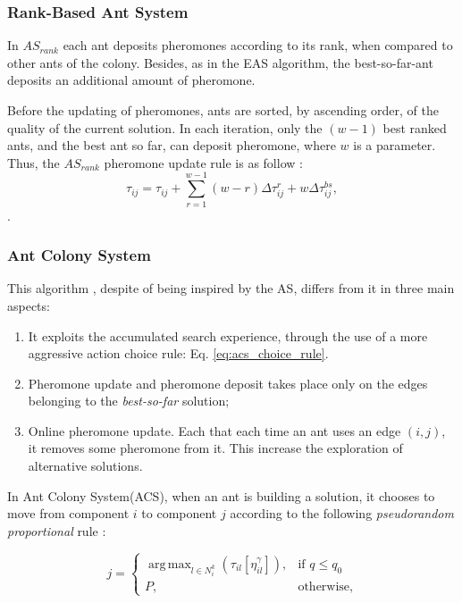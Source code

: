 					\subsubsection*{Rank-Based Ant System}

					In $AS_{rank}$ each ant deposits pheromones according to its rank, when compared to other ants of the colony. Besides, as in the EAS algorithm, the best-so-far-ant deposits an additional amount of pheromone.

					Before the updating of pheromones, ants are sorted, by ascending order, of the quality of the current solution. In each iteration, only the $(w-1)$ best ranked ants, and the best ant so far, can deposit pheromone, where $w$ is a parameter. Thus, the $AS_{rank}$ pheromone update rule is as follow \cite{bullnheimer97}:
					\begin{equation}
						\label{eq:asrank_pheromone_update}
						\tau_{ij} = \tau_{ij} + \sum_{r=1}^{w-1}(w-r)\Delta\tau_{ij}^r + w\Delta\tau_{ij}^{bs},
					\end{equation}.

					\subsubsection*{Ant Colony System}
					\label{sec:acs}
					This algorithm \cite{dorigo97}, despite of being inspired by the AS, differs from it in three main aspects:
					\begin{enumerate}
						\item It exploits the accumulated search experience, through the use of a more aggressive action choice rule: Eq. \ref{eq:acs_choice_rule}. 
						\item Pheromone update and pheromone deposit takes place only on the edges belonging to the \emph{best-so-far} solution;
						\item Online pheromone update. Each that each time an ant uses an edge $(i,j)$, it removes some pheromone from it. This increase the exploration of alternative solutions.
					\end{enumerate}

					In Ant Colony System(ACS), when an ant is building a solution, it chooses to move from component $i$ to component $j$ according to the following \emph{pseudorandom proportional} rule \cite{dorigo97}:

					\begin{equation} 
						\label{eq:acs_choice_rule}
						j =
						  \begin{cases}
						   \operatorname{arg\,\max}_{l \in N_{i}^k} (\tau_{il}[\eta_{il}^{\gamma}]), & \text{if } q \leq q_{0}  \\
						  	P, & \text{otherwise,}
						  \end{cases}
					\end{equation}

